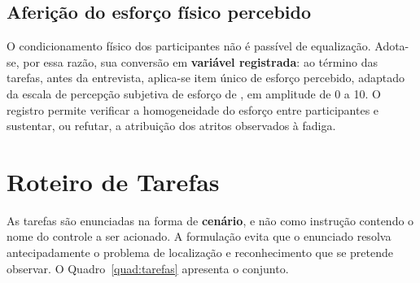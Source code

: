 \subsection{Aferição do esforço físico percebido}

O condicionamento físico dos participantes não é passível de equalização. Adota-se,
por essa razão, sua conversão em \textbf{variável registrada}: ao término das
tarefas, antes da entrevista, aplica-se item único de esforço percebido, adaptado
da escala de percepção subjetiva de esforço de , em amplitude
de 0 a 10. O registro permite verificar a homogeneidade do esforço entre
participantes e sustentar, ou refutar, a atribuição dos atritos observados à
fadiga.

\section{Roteiro de Tarefas}
\label{sec:tarefas}

As tarefas são enunciadas na forma de \textbf{cenário}, e não como instrução
contendo o nome do controle a ser acionado. A formulação evita que o enunciado
resolva antecipadamente o problema de localização e reconhecimento que se pretende
observar. O Quadro~\ref{quad:tarefas} apresenta o conjunto.

